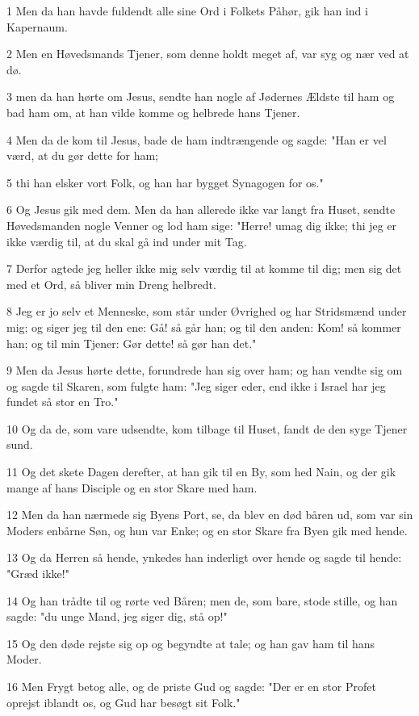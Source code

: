 \par 1 Men da han havde fuldendt alle sine Ord i Folkets Påhør, gik han ind i Kapernaum.
\par 2 Men en Høvedsmands Tjener, som denne holdt meget af, var syg og nær ved at dø.
\par 3 men da han hørte om Jesus, sendte han nogle af Jødernes Ældste til ham og bad ham om, at han vilde komme og helbrede hans Tjener.
\par 4 Men da de kom til Jesus, bade de ham indtrængende og sagde: "Han er vel værd, at du gør dette for ham;
\par 5 thi han elsker vort Folk, og han har bygget Synagogen for os."
\par 6 Og Jesus gik med dem. Men da han allerede ikke var langt fra Huset, sendte Høvedsmanden nogle Venner og lod ham sige: "Herre! umag dig ikke; thi jeg er ikke værdig til, at du skal gå ind under mit Tag.
\par 7 Derfor agtede jeg heller ikke mig selv værdig til at komme til dig; men sig det med et Ord, så bliver min Dreng helbredt.
\par 8 Jeg er jo selv et Menneske, som står under Øvrighed og har Stridsmænd under mig; og siger jeg til den ene: Gå! så går han; og til den anden: Kom! så kommer han; og til min Tjener: Gør dette! så gør han det."
\par 9 Men da Jesus hørte dette, forundrede han sig over ham; og han vendte sig om og sagde til Skaren, som fulgte ham: "Jeg siger eder, end ikke i Israel har jeg fundet så stor en Tro."
\par 10 Og da de, som vare udsendte, kom tilbage til Huset, fandt de den syge Tjener sund.
\par 11 Og det skete Dagen derefter, at han gik til en By, som hed Nain, og der gik mange af hans Disciple og en stor Skare med ham.
\par 12 Men da han nærmede sig Byens Port, se, da blev en død båren ud, som var sin Moders enbårne Søn, og hun var Enke; og en stor Skare fra Byen gik med hende.
\par 13 Og da Herren så hende, ynkedes han inderligt over hende og sagde til hende: "Græd ikke!"
\par 14 Og han trådte til og rørte ved Båren; men de, som bare, stode stille, og han sagde: "du unge Mand, jeg siger dig, stå op!"
\par 15 Og den døde rejste sig op og begyndte at tale; og han gav ham til hans Moder.
\par 16 Men Frygt betog alle, og de priste Gud og sagde: "Der er en stor Profet oprejst iblandt os, og Gud har besøgt sit Folk."
